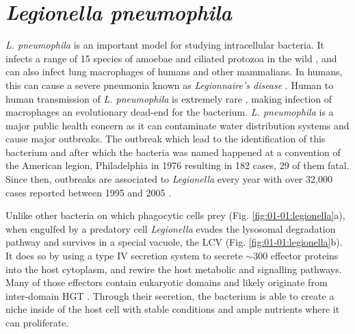 \section{\textit{Legionella pneumophila}}

\textit{L. pneumophila} is an important model for studying intracellular bacteria. It infects a range of 15 species of amoebae and ciliated protozoa in the wild \cite{rowbothamPreliminaryReportPathogenicity1980}, and can also infect lung macrophages of humans and other mammalians. In humans, this can cause a severe pneumonia known as \textit{Legionnaire's disease} \cite{edelsteinLegionnairesDiseasePontiac2014}. Human to human transmission of \textit{L. pneumophila} is extremely rare \cite{correiaProbablePersontoPersonTransmission2016}, making infection of macrophages an evolutionary dead-end for the bacterium. \textit{L. pneumophila} is a major public health concern as it can contaminate water distribution systems and cause major outbreaks. The outbreak which lead to the identification of this bacterium and after which the bacteria was named happened at a convention of the American legion, Philadelphia in 1976 resulting in 182 cases, 29 of them fatal. Since then, outbreaks are associated to \textit{Legionella} every year with over 32,000 cases reported between 1995 and 2005 \cite{mcdadeLegionellaPreventionLegionellosis2008}.

Unlike other bacteria on which phagocytic cells prey (Fig. \ref{fig:01-01:legionella}a), when engulfed by a predatory cell \textit{Legionella} evades the lysosomal degradation pathway and survives in a special vacuole, the \acrfull{LCV} (Fig. \ref{fig:01-01:legionella}b). It does so by using a type IV secretion system to secrete $\sim$300 effector proteins into the host cytoplasm, and rewire the host metabolic and signalling pathways. Many of those effectors contain eukaryotic domains and likely originate from inter-domain \acrshort{HGT} \cite{felipeEvidenceAcquisitionLegionella2005}. Through their secretion, the bacterium is able to create a niche inside of the host cell with stable conditions and ample nutrients where it can proliferate.


